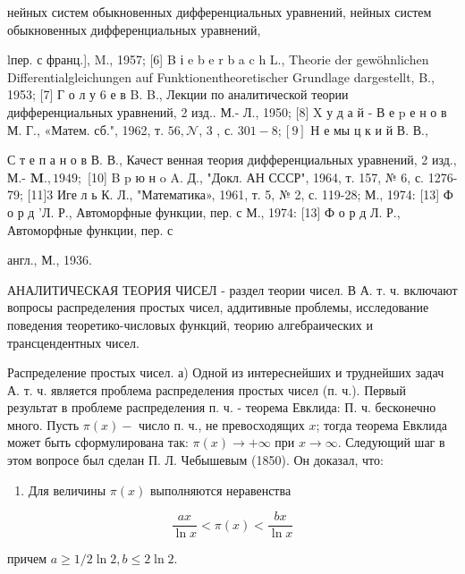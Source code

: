 \documentclass[10pt]{article}
\begin{document}
нейных систем обыкновенных дифференциальных уравнений, нейных систем обыкновенных дифференциальных уравнений,

lпер. с франц.], M., 1957; [6] B і e b e r b a c h L., Theorie der gewöhnlichen Differentialgleichungen auf Funktionentheoretischer Grundlage dargestellt, B., 1953; [7] Г о л у 6 е в B. B., Лекции по аналитической теории дифференциальных уравнений, 2 изд.. М.- Л., 1950; [8] X у д а й - В е p е н о в М. Г., «Матем. сб.", 1962, т. $56, \mathcal{N}$, 3 , с. $301-8 ;[9]$ Н е мы ц к и й В. В.,

С т е п а н о в В. В., Качест венная теория дифференциальных уравнений, 2 изд., М.- $\mathbf{M} ., 1949 ;$ [10] B p ю н o A. Д., "Докл. АН СССР", 1964, т. 157, № 6, с. 1276-79; [11]3 Иге л ь К. Л., "Математика», 1961, т. 5, № 2, с. 119-28; М., 1974: [13] Ф о р д 'Л. Р., Автоморфные функции, пер. с М., 1974: [13] Ф о р д Л. Р., Автоморфные функции, пер. с

англ., М., 1936.



АНАЛИТИЧЕСКАЯ ТЕОРИЯ ЧИСЕЛ - раздел теории чисел. В А. т. ч. включают вопросы распределения простых чисел, аддитивные проблемы, исследование поведения теоретико-числовых функций, теорию алгебраических и трансцендентных чисел.



Распределение простых чисел. а) Одной из интереснейших и труднейших задач А. т. ч. является проблема распределения простых чисел (п. ч.). Первый результат в проблеме распределения п. ч. - теорема Евклида: П. ч. бесконечно много. Пусть $\pi(x)-$ число п. ч., не превосходящих $x$; тогда теорема Евклида может быть сформулирована так: $\pi(x) \rightarrow+\infty$ при $x \rightarrow \infty$. Следующий шаг в этом вопросе был сделан П. Л. Чебышевым (1850). Он доказал, что:



\begin{enumerate}

  \item Для величины $\pi(x)$ выполняются неравенства

\end{enumerate}



\[

\frac{a x}{\ln x}<\pi(x)<\frac{b x}{\ln x}

\]



причем $a \geqslant 1 / 2 \ln 2, b \leqslant 2 \ln 2$.
\end{document}
